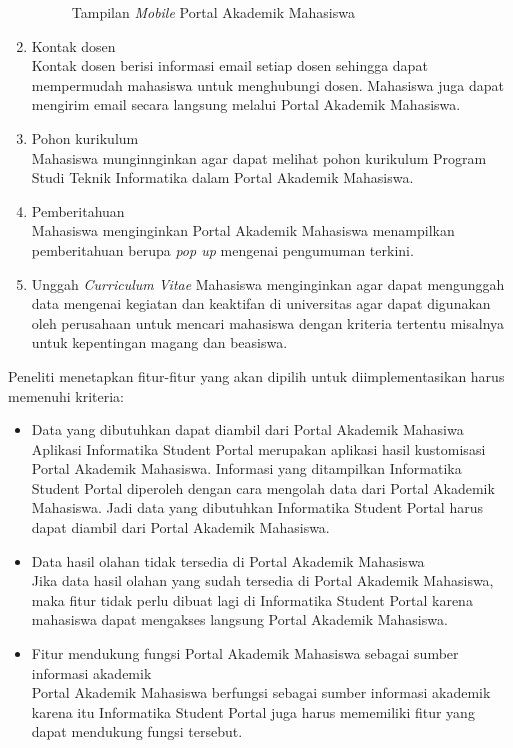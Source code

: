 \begin{enumerate}
\begin{figure}[H]
			\caption{Tampilan \textit{Mobile} Portal Akademik Mahasiswa} 
			\label{fig:3_pam_mobile}
		\end{figure}
	\item Kontak dosen\\
	Kontak dosen berisi informasi email setiap dosen sehingga dapat mempermudah mahasiswa untuk menghubungi dosen. Mahasiswa juga dapat mengirim email secara langsung melalui Portal Akademik Mahasiswa.
	\item Pohon kurikulum\\
	Mahasiswa munginnginkan agar dapat melihat pohon kurikulum Program Studi Teknik Informatika dalam Portal Akademik Mahasiswa.
	\item Pemberitahuan\\
	Mahasiswa menginginkan Portal Akademik Mahasiswa menampilkan pemberitahuan berupa \textit{pop up} mengenai pengumuman terkini.
	\item Unggah \textit{Curriculum Vitae}
	Mahasiswa menginginkan agar dapat mengunggah data mengenai kegiatan dan keaktifan di universitas agar dapat digunakan oleh perusahaan untuk mencari mahasiswa dengan kriteria tertentu misalnya untuk kepentingan magang dan beasiswa.
\end{enumerate}

Peneliti menetapkan fitur-fitur yang akan dipilih untuk diimplementasikan harus memenuhi kriteria:
\begin{itemize}
	\item Data yang dibutuhkan dapat diambil dari Portal Akademik Mahasiwa \\
	Aplikasi Informatika Student Portal merupakan aplikasi hasil kustomisasi Portal Akademik Mahasiswa. Informasi yang ditampilkan Informatika Student Portal diperoleh dengan cara mengolah data dari Portal Akademik Mahasiswa. Jadi data yang dibutuhkan Informatika Student Portal harus dapat diambil dari Portal Akademik Mahasiswa. 
	\item Data hasil olahan tidak tersedia di Portal Akademik Mahasiswa\\
	Jika data hasil olahan yang sudah tersedia di Portal Akademik Mahasiswa, maka fitur tidak perlu dibuat lagi di Informatika Student Portal karena mahasiswa dapat mengakses langsung Portal Akademik Mahasiswa.
	\item Fitur mendukung fungsi Portal Akademik Mahasiswa sebagai sumber informasi akademik \\
	Portal Akademik Mahasiswa berfungsi sebagai sumber informasi akademik karena itu Informatika Student Portal juga harus mememiliki fitur yang dapat mendukung fungsi tersebut.
\end{itemize}

